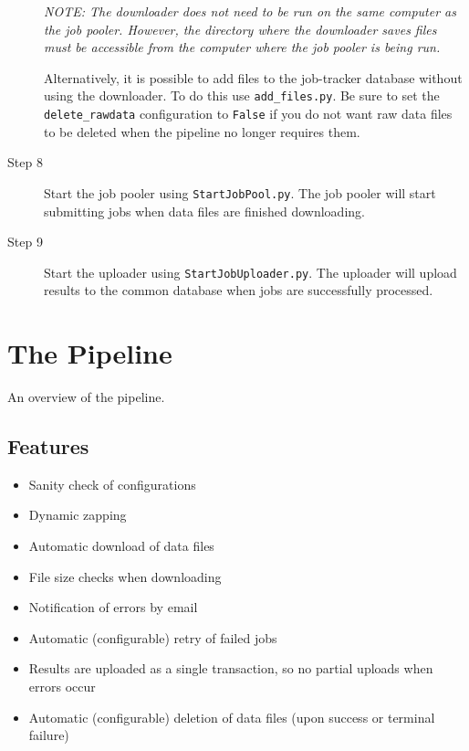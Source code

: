 \begin{description}
        \smallskip
        
        \textit{NOTE: The downloader does not need to be run on the same computer as the job pooler. However, the directory where the downloader saves files must be accessible from the computer where the job pooler is being run.}
        
        \smallskip
        
        Alternatively, it is possible to add files to the job-tracker database without using the downloader. To do this use \texttt{add\_files.py}. Be sure to set the \texttt{delete\_rawdata} configuration to \texttt{False} if you do not want raw data files to be deleted when the pipeline no longer requires them. 

    \item[Step 8] Start the job pooler using \texttt{StartJobPool.py}. The job pooler will start submitting jobs when data files are finished downloading. 

    \item[Step 9] Start the uploader using \texttt{StartJobUploader.py}. The uploader will upload results to the common database when jobs are successfully processed.
\end{description}


\section{The Pipeline}
An overview of the pipeline.

\subsection{Features}
\begin{itemize}
    \item Sanity check of configurations
    \item Dynamic zapping
    \item Automatic download of data files
    \item File size checks when downloading
    \item Notification of errors by email
    \item Automatic (configurable) retry of failed jobs
    \item Results are uploaded as a single transaction, so no partial uploads when errors occur
    \item Automatic (configurable) deletion of data files (upon success or terminal failure)
\end{itemize}


